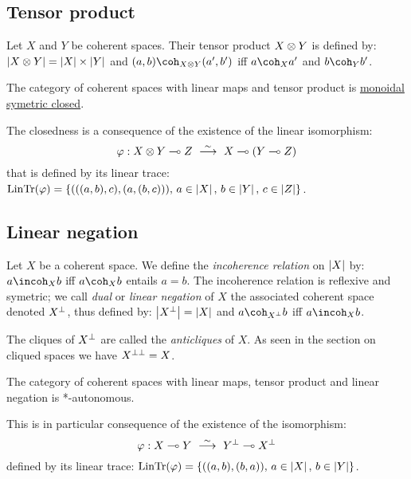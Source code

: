 \subsection{Tensor product}\label{tensor-product}

\begin{definition}
Let $X$ and $Y$ be coherent spaces. Their tensor product $X\otimes Y$ is defined by: $\left|X\otimes Y\right| = \left|X\right|\times\left|Y\right|$ and $(a,b)\coh_{X\tens Y}(a',b')$ iff $a\coh_X a'$ and $b\coh_Y b'$.
\end{definition}

\begin{theorem}
The category of coherent spaces with linear maps and tensor product is \hyperref[modeling-imll]{monoidal symetric closed}.
\end{theorem}

The closedness is a consequence of the existence of the linear
isomorphism:
\begin{equation*}
\varphi:X\tens Y\limp Z\ \stackrel{\sim}{\longrightarrow}\ X\limp(Y\limp Z)
\end{equation*}
that is defined by its linear trace:
\(\mathrm{LinTr}(\varphi) = \{(((a, b), c), (a, (b, c))),\, a\in\left|X\right|,\, b\in \left|Y\right|,\, c\in\left|Z\right|\}\).

\subsection{Linear negation}\label{linear-negation}

\begin{definition}
Let $X$ be a coherent space. We define the \emph{incoherence relation} on $\left|X\right|$ by: $a\incoh_X b$ iff $a\coh_X b$ entails $a=b$. The incoherence relation is reflexive and symetric; we call \emph{dual} or \emph{linear negation} of $X$ the associated coherent space denoted $X^\bot$, thus defined by: $\left|X^\bot\right| = \left|X\right|$ and $a\coh_{X\orth} b$ iff $a\incoh_X b$.
\end{definition}

The cliques of \(X^\bot\) are called the \emph{anticliques} of \(X\). As
seen in the section on cliqued spaces we have \(X^{\bot\bot}=X\).

\begin{theorem}
The category of coherent spaces with linear maps, tensor product and linear negation is *-autonomous.
\end{theorem}

This is in particular consequence of the existence of the isomorphism:
\begin{equation*}
\varphi:X\limp Y\ \stackrel{\sim}{\longrightarrow}\ Y\orth\limp X\orth
\end{equation*}
defined by its linear trace:
\(\mathrm{LinTr}(\varphi) = \{((a, b), (b, a)),\, a\in\left|X\right|,\, b\in\left|Y\right|\}\).

